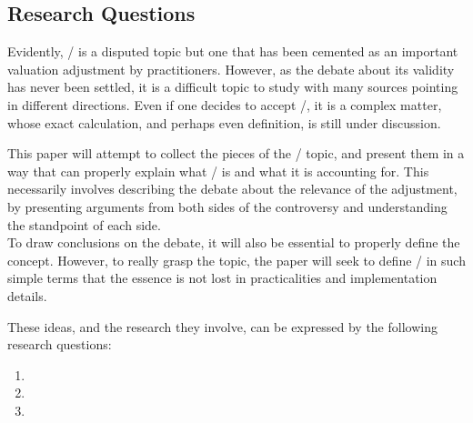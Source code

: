 \documentclass[main.tex]{subfiles}
\begin{document}
    \subsection{Research Questions}
        
    Evidently, \FVA/ is a disputed topic 
    but one that has been cemented as an important valuation adjustment by practitioners.
    However, as the debate about its validity has never been settled,
    it is a difficult topic to study with many sources pointing in different directions.
    Even if one decides to accept \FVA/, it is a complex matter,
    whose exact calculation, and perhaps even definition, is still under discussion.

    This paper will attempt to collect the pieces of the \FVA/ topic,
    and present them in a way that can properly explain what \FVA/ is and what it is accounting for.
    This necessarily involves describing the debate about the relevance of the adjustment,
    by presenting arguments from both sides of the controversy 
    and understanding the standpoint of each side.
    \\
    To draw conclusions on the debate, it will also be essential to properly define the concept.
    However, to really grasp the topic, the paper will seek to define \FVA/ in such simple terms 
    that the essence is not lost in practicalities and implementation details.

    These ideas, and the research they involve, can be expressed by the following research questions:
    \begin{enumerate}
        \item \researchQuestionFundingCosts
        \item \researchQuestionFvaDebate
        \item \researchQuestionFvaImplications
    \end{enumerate}
\end{document}
